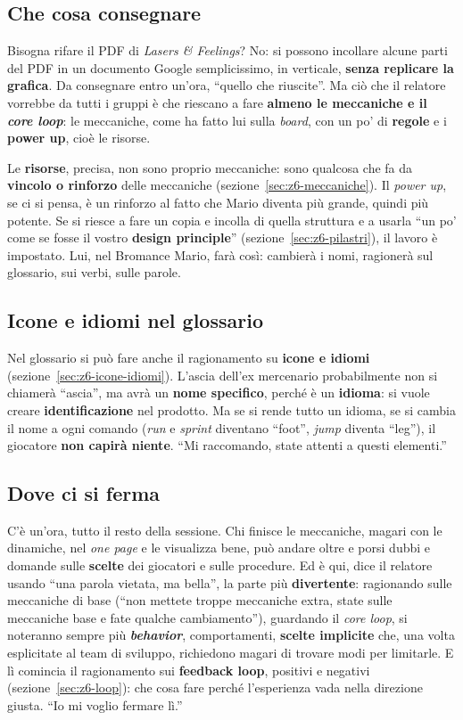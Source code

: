 \subsection{Che cosa consegnare}

Bisogna rifare il PDF di \emph{Lasers \& Feelings}? No: si possono incollare alcune
parti del PDF in un documento Google semplicissimo, in verticale, \textbf{senza
replicare la grafica}. Da consegnare entro un'ora, ``quello che riuscite''. Ma ciò
che il relatore vorrebbe da tutti i gruppi è che riescano a fare
\textbf{almeno le meccaniche e il \emph{core loop}}: le meccaniche, come ha fatto
lui sulla \emph{board}, con un po' di \textbf{regole} e i \textbf{power up}, cioè
le risorse.

Le \textbf{risorse}, precisa, non sono proprio meccaniche: sono qualcosa che fa da
\textbf{vincolo o rinforzo} delle meccaniche (sezione~\ref{sec:z6-meccaniche}). Il
\emph{power up}, se ci si pensa, è un rinforzo al fatto che Mario diventa più
grande, quindi più potente. Se si riesce a fare un copia e incolla di quella
struttura e a usarla ``un po' come se fosse il vostro \textbf{design principle}''
(sezione~\ref{sec:z6-pilastri}), il lavoro è impostato. Lui, nel Bromance Mario,
farà così: cambierà i nomi, ragionerà sul glossario, sui verbi, sulle parole.

\subsection{Icone e idiomi nel glossario}

Nel glossario si può fare anche il ragionamento su \textbf{icone e idiomi}
(sezione~\ref{sec:z6-icone-idiomi}). L'ascia dell'ex mercenario probabilmente non
si chiamerà ``ascia'', ma avrà un \textbf{nome specifico}, perché è un
\textbf{idioma}: si vuole creare \textbf{identificazione} nel prodotto. Ma se si
rende tutto un idioma, se si cambia il nome a ogni comando (\emph{run} e
\emph{sprint} diventano ``foot'', \emph{jump} diventa ``leg''), il giocatore
\textbf{non capirà niente}. ``Mi raccomando, state attenti a questi elementi.''

\subsection{Dove ci si ferma}

C'è un'ora, tutto il resto della sessione. Chi finisce le meccaniche, magari con le
dinamiche, nel \emph{one page} e le visualizza bene, può andare oltre e porsi dubbi e
domande sulle \textbf{scelte} dei giocatori e sulle procedure. Ed è qui, dice il
relatore usando ``una parola vietata, ma bella'', la parte più
\textbf{divertente}: ragionando sulle meccaniche di base (``non mettete troppe
meccaniche extra, state sulle meccaniche base e fate qualche cambiamento''),
guardando il \emph{core loop}, si noteranno sempre più \textbf{\emph{behavior}},
comportamenti, \textbf{scelte implicite} che, una volta esplicitate al team di
sviluppo, richiedono magari di trovare modi per limitarle. E lì comincia il
ragionamento sui \textbf{feedback loop}, positivi e negativi
(sezione~\ref{sec:z6-loop}): che cosa fare perché l'esperienza vada nella
direzione giusta. ``Io mi voglio fermare lì.''

